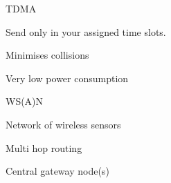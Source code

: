 \documentclass[main.tex]{subfiles}
\begin{document}
\begin{card}{TDMA}
\item Send only in your assigned time slots.
\item Minimises collisions
\item Very low power consumption
\end{card}

\begin{card}{WS(A)N}
\item Network of wireless sensors
\item Multi hop routing
\item Central gateway node(s)
\end{card}
\end{document}
